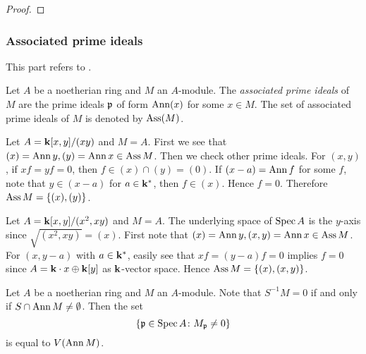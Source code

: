         \begin{corollary}\label{cor: upper semicontinuity of dim F|_y}
            
        \end{corollary}
        \begin{proof}
        \end{proof}



    \subsubsection{Associated prime ideals}

        This part refers to \cite[Chapter 3]{Mat70}.

        \begin{definition}\label{def: associated prime ideals}
            Let $A$ be a noetherian ring and $M$ an $A$-module.
            The \textit{associated prime ideals} of $M$ are the prime ideals ${\mathfrak{p}}$ of form $\operatorname{Ann}(x)$ for some $x \in M$.
            The set of associated prime ideals of $M$ is denoted by $\operatorname{Ass}(M)$.
        \end{definition}

        \begin{example}
            Let $A = {\mathbf{k}}[x,y]/(xy)$ and $M = A$.
            First we see that $(x) = \operatorname{Ann} y, (y) = \operatorname{Ann} x \in \operatorname{Ass} M$.
            Then we check other prime ideals.
            For $(x,y)$, if $xf = yf = 0$, then $f \in (x) \cap (y) = (0)$.
            If $(x-a) = \operatorname{Ann} f$ for some $f$, note that $y \in (x-a)$ for $a \in {\mathbf{k}}^*$, then $f \in (x)$.
            Hence $f = 0$. 
            Therefore $\operatorname{Ass} M = \{ (x), (y) \}$.
        \end{example}

        \begin{example}
            Let $A = {\mathbf{k}}[x,y]/(x^2, xy)$ and $M = A$.
            The underlying space of $\operatorname{Spec} A$ is the $y$-axis since $\sqrt{(x^2,xy)} = (x)$.
            First note that $(x) = \operatorname{Ann} y, (x,y) = \operatorname{Ann} x \in \operatorname{Ass} M$.
            For $(x,y-a)$ with $a \in {\mathbf{k}}^*$, easily see that $xf = (y-a)f = 0$ implies $f=0$ since $A = {\mathbf{k}} \cdot x \oplus {\mathbf{k}}[y]$ as ${\mathbf{k}}$-vector space.
            Hence $\operatorname{Ass} M = \{ (x), (x,y) \}$.
        \end{example}

        Let $A$ be a noetherian ring and $M$ an $A$-module.
        Note that $S^{-1}M = 0$ if and only if $S \cap \operatorname{Ann} M \neq \emptyset$.
        Then the set 
        \[ \{ {\mathfrak{p}} \in \operatorname{Spec} A \colon M_{\mathfrak{p}} \neq 0 \} \]
        is equal to $V(\operatorname{Ann} M)$.
        
